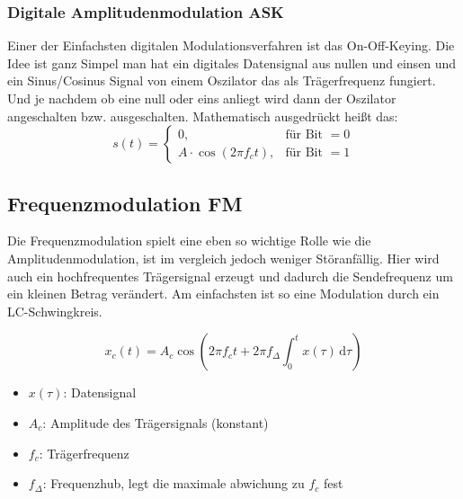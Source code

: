 \subsubsection{Digitale Amplitudenmodulation ASK}
Einer der Einfachsten digitalen Modulationsverfahren ist 
das On-Off-Keying. 
Die Idee ist ganz Simpel man hat ein digitales Datensignal aus nullen und einsen
und ein Sinus/Cosinus Signal von einem Oszilator das als Trägerfrequenz fungiert.
Und je nachdem ob eine null oder eins anliegt wird dann der Oszilator angeschalten bzw. ausgeschalten.
Mathematisch ausgedrückt heißt das:
\begin{equation}
s(t) =
\begin{cases}
0, & \text{für Bit } = 0 \\
A \cdot \cos(2 \pi f_c t), & \text{für Bit } = 1
\end{cases}
\end{equation}




\subsection{Frequenzmodulation FM}
Die Frequenzmodulation spielt eine eben so wichtige Rolle wie die Amplitudenmodulation,
ist im vergleich jedoch weniger Störanfällig. 
Hier wird auch ein hochfrequentes Trägersignal erzeugt und dadurch die Sendefrequenz um ein kleinen Betrag verändert.
Am einfachsten ist so eine Modulation durch ein LC-Schwingkreis.

\begin{equation}
x_c(t) = A_c \cos\left( 2\pi f_c t + 2\pi f_\Delta \int_0^t x(\tau) \, \mathrm{d}\tau \right)
\end{equation}
\begin{itemize}
    \item $x(\tau)$: Datensignal
    \item $A_c$: Amplitude des Trägersignals (konstant)
    \item $f_c$: Trägerfrequenz 
    \item $f_\Delta$: Frequenzhub, legt die maximale abwichung zu $f_c$ fest
\end{itemize}
\clearpage

